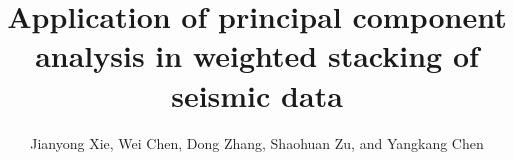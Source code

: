 
\title{Application of principal component analysis in weighted stacking of seismic data}
\renewcommand{\thefootnote}{\fnsymbol{footnote}}

\author{Jianyong Xie\footnotemark[1], Wei Chen\footnotemark[2], Dong Zhang\footnotemark[1], Shaohuan Zu\footnotemark[1], and Yangkang Chen\footnotemark[3]}

\address{
\footnotemark[1]
State Key Laboratory of Petroleum Resources and Prospecting \\
China University of Petroleum \\
Fuxue Road 18th\\
Beijing, China, 102200 \\
gsw19900128@126.com\\
\footnotemark[2]
Key Laboratory of Exploration Technology for Oil and Gas Resources of Ministry of Education, Yangtze University, Wuhan, Hubei, China, 430100, Hubei Cooperative Innovation Center of Unconventional Oil and Gas, Wuhan, Hubei, China, 430100, and State Key Laboratory of Geodesy and Earth's Dynamics, Institute of Geodesy and Geophysics, Chinese Academy of Sciences, Wuhan, China, 430077, chenwei2014@yangtzeu.edu.cn.\\
gsw19900128@126.com\\
\footnotemark[3] Jackson School of Geosciences\\
The University of Texas at Austin\\
University Station, Box X\\
Austin, TX 78713-8924, USA \\
Email: ykchen@utexas.edu\\
}

\maketitle

